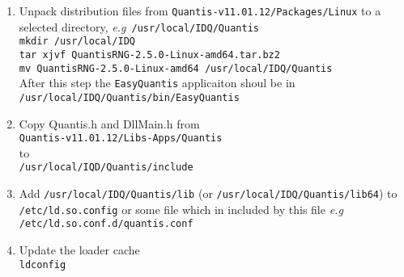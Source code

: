 \documentclass[a4paper,11pt]{article}
\newcommand{\eg}{\textsl{e.g}}
\begin{document}
\begin{enumerate}
    \item Unpack distribution files from
   \texttt{Quantis-v11.01.12/Packages/Linux} to a selected directory, \eg\
   \texttt{/usr/local/IDQ/Quantis}\\ \texttt{mkdir /usr/local/IDQ}\\ \texttt{tar
   xjvf QuantisRNG-2.5.0-Linux-amd64.tar.bz2}\\ \texttt{mv
   QuantisRNG-2.5.0-Linux-amd64 /usr/local/IDQ/Quantis}\\
    After this step the \texttt{EasyQuantis} applicaiton shoul be in\\ \texttt{/usr/local/IDQ/Quantis/bin/EasyQuantis}
    \item Copy {Quantis.h} and {DllMain.h} from\\
   \texttt{Quantis-v11.01.12/Libs-Apps/Quantis}\\ to\\
   \texttt{/usr/local/IQD/Quantis/include}
    \item Add \texttt{/usr/local/IDQ/Quantis/lib} (or
    \texttt{/usr/local/IDQ/Quantis/lib64}) to \\ \texttt{/etc/ld.so.config} or some
    file which in included by this file \eg\ \\
    \texttt{/etc/ld.so.conf.d/quantis.conf}
    \item Update the loader cache\\
    \texttt{ldconfig}
\end{enumerate}
\end{document}
